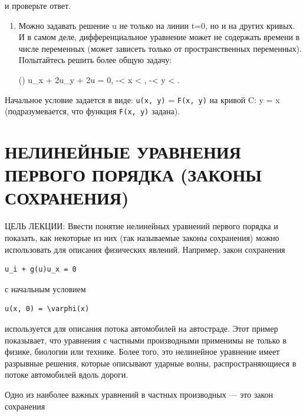 \documentclass[
  ukrainian,
]{article}
\begin{document}
и проверьте ответ.

\begin{enumerate}
\def\labelenumi{\arabic{enumi}.}
\setcounter{enumi}{4}
\item
  Можно задавать решение u не только на линии t=0, но и на других
  кривых. И в самом деле, дифференциальное уравнение может не содержать
  времени в числе переменных (может зависеть только от пространственных
  переменных). Полытайтесь решить более общую задачу:

  () \quad u\_x + 2u\_y + 2u = 0, \quad -\infty \textless{} x
  \textless{} \infty, \quad -\infty \textless{} y \textless{} \infty.
\end{enumerate}

Начальное условие задается в виде: \texttt{u(x,\ y)} = \texttt{F(x,\ y)}
на кривой C: y = x (подразумевается, что функция \texttt{F(x,\ y)}
задана).

\section{НЕЛИНЕЙНЫЕ УРАВНЕНИЯ ПЕРВОГО ПОРЯДКА (ЗАКОНЫ
СОХРАНЕНИЯ)}\label{ux43dux435ux43bux438ux43dux435ux439ux43dux44bux435-ux443ux440ux430ux432ux43dux435ux43dux438ux44f-ux43fux435ux440ux432ux43eux433ux43e-ux43fux43eux440ux44fux434ux43aux430-ux437ux430ux43aux43eux43dux44b-ux441ux43eux445ux440ux430ux43dux435ux43dux438ux44f}

ЦЕЛЬ ЛЕКЦИИ: Ввести понятие нелинейных уравнений первого порядка и
показать, как некоторые из них (так называемые законы сохранения) можно
использовать для описания физических явлений. Например, закон сохранения

\begin{verbatim}
u_i + g(u)u_x = 0
\end{verbatim}

с начальным условием

\begin{verbatim}
u(x, 0) = \varphi(x)
\end{verbatim}

используется для описания потока автомобилей на автостраде. Этот пример
показывает, что уравнения с частными производными применимы не только в
физике, биологии или технике. Более того, это нелинейное уравнение имеет
разрывные решения, которые описывают ударные волны, распространяющиеся в
потоке автомобилей вдоль дороги.

Одно из наиболее важных уравнений в частных производных --- это закон
сохранения
\end{document}
